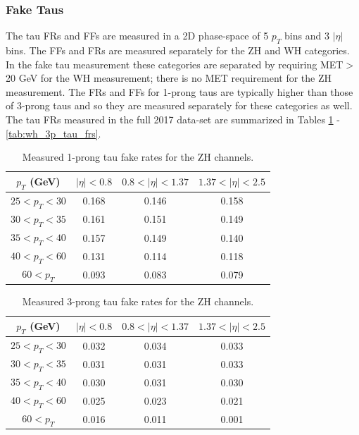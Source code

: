 \subsubsection{Fake Taus}
The tau FRs and FFs are measured in a 2D phase-space of 5 $p_T$ bins and 3 $|\eta|$ bins. The FFs and FRs are measured separately for the ZH and WH categories. In the fake tau measurement these categories are separated by requiring MET$>$20 GeV for the WH measurement; there is no MET requirement for the ZH measurement. The FRs and FFs for 1-prong taus are typically higher than those of 3-prong taus and so they are measured separately for these categories as well. The tau FRs measured in the full 2017 data-set are summarized in Tables \ref{tab:zh_1p_tau_frs} - \ref{tab:wh_3p_tau_frs}.\\

\begin{table}[htb!]
    \centering
    \begin{tabular}{|c|c|c|c|}
    \hline
    $p_T$ (GeV) & $|\eta|<0.8$ & $0.8<|\eta|<1.37$ & $1.37<|\eta|<2.5$\\
    \hline
    $25<p_T<30$ & 0.168 & 0.146 & 0.158\\
    $30<p_T<35$ & 0.161 & 0.151 & 0.149\\
    $35<p_T<40$ & 0.157 & 0.149 & 0.140\\
    $40<p_T<60$ & 0.131 & 0.114 & 0.118\\
    $60<p_T$ & 0.093 & 0.083 & 0.079\\
    \hline
    \end{tabular}
    \caption{Measured 1-prong tau fake rates for the ZH channels.}
    \label{tab:zh_1p_tau_frs}
\end{table}

\begin{table}[htb!]
    \centering
    \begin{tabular}{|c|c|c|c|}
    \hline
    $p_T$ (GeV) & $|\eta|<0.8$ & $0.8<|\eta|<1.37$ & $1.37<|\eta|<2.5$\\
    \hline
    $25<p_T<30$ & 0.032 & 0.034 & 0.033\\
    $30<p_T<35$ & 0.031 & 0.031 & 0.033\\
    $35<p_T<40$ & 0.030 & 0.031 & 0.030\\
    $40<p_T<60$ & 0.025 & 0.023 & 0.021\\
    $60<p_T$ & 0.016 & 0.011 & 0.001\\
    \hline
    \end{tabular}
    \caption{Measured 3-prong tau fake rates for the ZH channels.}
    \label{tab:zh_3p_tau_frs}
\end{table}


